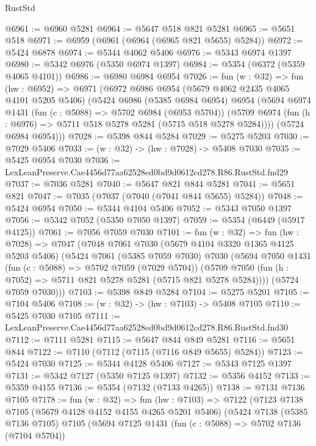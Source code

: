 \begin{lexlean}{RustStd}
\begin{coremodule}
@6961 := @6960 @5281
@6964 := @5647 @518 @821 @5281
@6965 := @5651 @518
@6971 := @6959 (@6961 (@6964 (@6965 @821 @5655) @5284))
@6972 := @5424 @6878
@6974 := @5344 @4062 @5406
@6976 := @5343 @6974 @1397
@6980 := @5342 @6976 (@5350 @6974 @1397)
@6984 := @5354 (@6372 (@5359 @4065 @4101))
@6986 := @6980 @6984 @6954
@7026 := fun (w : @32) =>
  fun (hw : @6952) =>
  @6971
    (@6972
      @6986
      @6954
      (@5679 @4062 @2435 @4065 @4101 @5205 @5406)
      (@5424
        @6986
        (@5385 @6984 @6954)
        @6954
        (@5694
          @6974
          @1431
          (fun (c : @5088) => @5702 @6984 (@6953 @5704))
          (@5709 @6974 (fun (h : @6976) => @5711 @518 @5278 @5281 (@5715 @518 @5278 @5284))))
        (@5724 @6984 @6954)))
@7028 := @5398 @844 @5284
@7029 := @5275 @5203
@7030 := @7029 @5406
@7033 := (w : @32) -> (hw : @7028) -> @5408 @7030
@7035 := @5425 @6954 @7030
@7036 := LexLeanPreserve.Cae4456d77aa62528ed0bd9d0612cd278.R86.RustStd.fnd29
@7037 := @7036 @5281
@7040 := @5647 @821 @844 @5281
@7041 := @5651 @821
@7047 := @7035 (@7037 (@7040 (@7041 @844 @5655) @5284))
@7048 := @5424 @6954
@7050 := @5344 @4104 @5406
@7052 := @5343 @7050 @1397
@7056 := @5342 @7052 (@5350 @7050 @1397)
@7059 := @5354 (@6449 (@5917 @4125))
@7061 := @7056 @7059 @7030
@7101 := fun (w : @32) =>
  fun (hw : @7028) =>
  @7047
    (@7048
      @7061
      @7030
      (@5679 @4104 @3320 @1365 @4125 @5203 @5406)
      (@5424
        @7061
        (@5385 @7059 @7030)
        @7030
        (@5694
          @7050
          @1431
          (fun (c : @5088) => @5702 @7059 (@7029 @5704))
          (@5709 @7050 (fun (h : @7052) => @5711 @821 @5278 @5281 (@5715 @821 @5278 @5284))))
        (@5724 @7059 @7030)))
@7103 := @5398 @849 @5284
@7104 := @5275 @5201
@7105 := @7104 @5406
@7108 := (w : @32) -> (hw : @7103) -> @5408 @7105
@7110 := @5425 @7030 @7105
@7111 := LexLeanPreserve.Cae4456d77aa62528ed0bd9d0612cd278.R86.RustStd.fnd30
@7112 := @7111 @5281
@7115 := @5647 @844 @849 @5281
@7116 := @5651 @844
@7122 := @7110 (@7112 (@7115 (@7116 @849 @5655) @5284))
@7123 := @5424 @7030
@7125 := @5344 @4128 @5406
@7127 := @5343 @7125 @1397
@7131 := @5342 @7127 (@5350 @7125 @1397)
@7132 := @5356 @4152
@7133 := @5359 @4155
@7136 := @5354 (@7132 (@7133 @4265))
@7138 := @7131 @7136 @7105
@7178 := fun (w : @32) =>
  fun (hw : @7103) =>
  @7122
    (@7123
      @7138
      @7105
      (@5679 @4128 @4152 @4155 @4265 @5201 @5406)
      (@5424
        @7138
        (@5385 @7136 @7105)
        @7105
        (@5694
          @7125
          @1431
          (fun (c : @5088) => @5702 @7136 (@7104 @5704))

\end{coremodule}
\end{lexlean}
